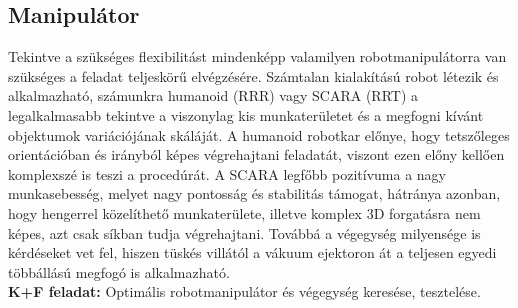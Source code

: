 \documentclass{article}
\begin{document}
\subsection{Manipulátor}
Tekintve a szükséges flexibilitást mindenképp valamilyen robotmanipulátorra van szükséges
a feladat teljeskörű elvégzésére. Számtalan kialakítású robot létezik és alkalmazható, számunkra
humanoid (RRR) vagy SCARA (RRT) a legalkalmasabb tekintve a viszonylag kis munkaterületet és
a megfogni kívánt objektumok variációjának skáláját. A humanoid robotkar előnye, hogy tetszőleges
orientációban és irányból képes végrehajtani feladatát, viszont ezen előny kellően komplexszé is teszi
a procedúrát. A SCARA legfőbb pozitívuma a nagy munkasebesség, melyet nagy pontosság és stabilitás
támogat, hátránya azonban, hogy hengerrel közelíthető munkaterülete, illetve komplex 3D forgatásra nem képes, azt
csak síkban tudja végrehajtani. Továbbá a végegység milyensége is kérdéseket vet fel, hiszen
tüskés villától a vákuum ejektoron át a teljesen egyedi többállású megfogó is alkalmazható.\vspace{5pt}\\
\textbf{K+F feladat: }Optimális robotmanipulátor és végegység keresése, tesztelése.
\end{document}
